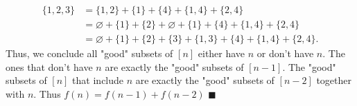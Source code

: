 \documentclass{report}
\begin{document}
\begin{itemize}
            \begin{align*}
                \{1,2,3\} &= \{1,2\} + \{1\}  + \{4\} + \{1,4\} + \{2,4\} \\
                          &=  \varnothing + \{1\} + \{2\} + \varnothing + \{1\} + \{4\} + \{1,4\} + \{2,4\} \\
                          &= \varnothing + \{1\} + \{2\} + \{3\} + \{1,3\} + \{4\} + \{1,4\} + \{2,4\} 
            .\end{align*}
            Thus, we conclude all "good" subsets of $[n]$ either have $n$ or don't have $n$. The ones that don't have $n$ are exactly the "good" subsets of $[n-1]$. The "good" subsets of $[n]$ that include $n$ are exactly the "good" subsets of $[n-2]$ together with $n$. Thus $f(n) = f(n-1) + f(n-2) $ $\blacksquare$
            
    \end{itemize}

    \pagebreak 
\end{document}
